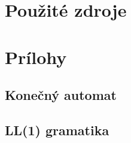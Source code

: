 \documentclass[11pt,a4paper]{article}
\begin{document}
\section{Použité zdroje}

{}

\newpage
\section{Prílohy}


\subsection{Konečný automat}
\label{app:automat}


\newpage

\subsection{LL(1) gramatika}
\label{gramatika}
\end{document}
